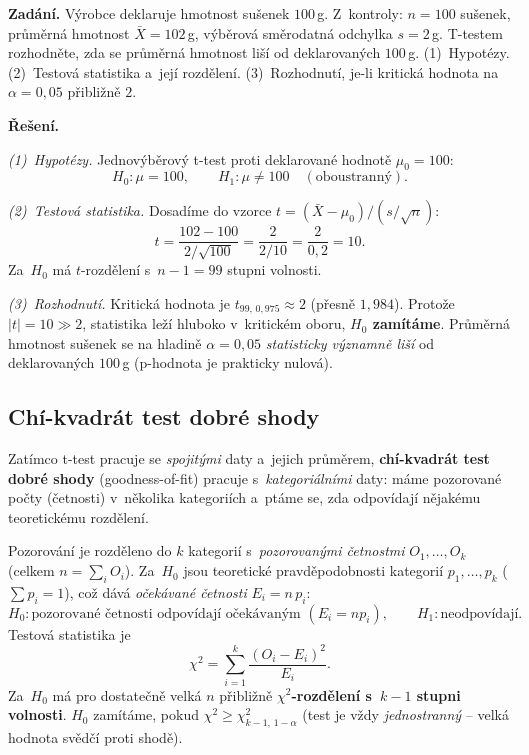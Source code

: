 \begin{priklad}
\par
\textbf{Zadání.} Výrobce deklaruje hmotnost sušenek $100\,$g. Z~kontroly: $n=100$ sušenek, průměrná hmotnost $\bar X=102\,$g, výběrová směrodatná odchylka $s=2\,$g. T-testem rozhodněte, zda se průměrná hmotnost liší od deklarovaných $100\,$g. (1)~Hypotézy. (2)~Testová statistika a~její rozdělení. (3)~Rozhodnutí, je-li kritická hodnota na $\alpha=0{,}05$ přibližně $2$.

\smallskip
\textbf{Řešení.}

\emph{(1)~Hypotézy.} Jednovýběrový t-test proti deklarované hodnotě $\mu_0=100$:
\[ H_0\colon \mu=100,\qquad H_1\colon \mu\neq 100 \quad(\text{oboustranný}). \]

\emph{(2)~Testová statistika.} Dosadíme do vzorce $t=(\bar X-\mu_0)/(s/\sqrt n)$:
\[ t=\frac{102-100}{2/\sqrt{100}}=\frac{2}{2/10}=\frac{2}{0{,}2}=\boxed{10}. \]
Za~$H_0$ má $t$-rozdělení s~$n-1=\boxed{99}$ stupni volnosti.

\emph{(3)~Rozhodnutí.} Kritická hodnota je $t_{99,\,0{,}975}\approx 2$ (přesně $1{,}984$). Protože $|t|=10\gg 2$, statistika leží hluboko v~kritickém oboru, \textbf{$H_0$ zamítáme}. Průměrná hmotnost sušenek se na hladině $\alpha=0{,}05$ \emph{statisticky významně liší} od deklarovaných $100\,$g (p-hodnota je prakticky nulová).
\end{priklad}

\subsection{Chí-kvadrát test dobré shody}

Zatímco t-test pracuje se \emph{spojitými} daty a~jejich průměrem, \textbf{chí-kvadrát test dobré shody} (goodness-of-fit) pracuje s~\emph{kategoriálními} daty: máme pozorované počty (četnosti) v~několika kategoriích a~ptáme se, zda odpovídají nějakému teoretickému rozdělení.

\begin{definice}
Pozorování je rozděleno do $k$ kategorií s~\emph{pozorovanými četnostmi} $O_1,\dots,O_k$ (celkem $n=\sum_i O_i$). Za~$H_0$ jsou teoretické pravděpodobnosti kategorií $p_1,\dots,p_k$ ($\sum p_i=1$), což dává \emph{očekávané četnosti} $E_i=n\,p_i$:
\[ H_0\colon \text{pozorované četnosti odpovídají očekávaným } (E_i=n p_i), \qquad H_1\colon \text{neodpovídají}. \]
Testová statistika je
\[ \chi^2=\sum_{i=1}^k \frac{(O_i-E_i)^2}{E_i}. \]
Za~$H_0$ má pro dostatečně velká $n$ přibližně \textbf{$\chi^2$-rozdělení s~$k-1$ stupni volnosti}. $H_0$ zamítáme, pokud $\chi^2\ge \chi^2_{k-1,\,1-\alpha}$ (test je vždy \emph{jednostranný} -- velká hodnota svědčí proti shodě).
\end{definice}

